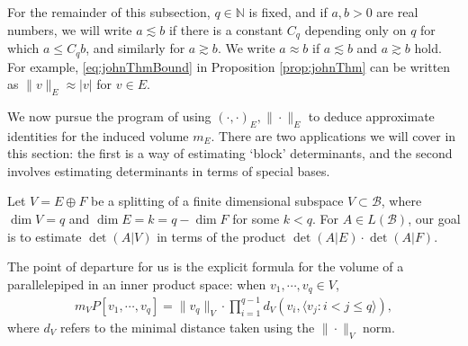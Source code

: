 \documentclass[11pt]{amsart}
\theoremstyle{theorem}
\theoremstyle{definition}
\numberwithin{equation}{section}
\newcommand{\N}{\mathbb{N}}
\newcommand{\Bc}{\mathcal{B}}
\begin{document}
 For the remainder of this subsection, $q \in \N$ is fixed, and if $a,b > 0$ are real numbers, we will write $a \lesssim b$ if there is a constant $C_q$ depending only on $q$ for which $a \leq C_q b$, and similarly for $a \gtrsim b$. We write $a \approx b$ if $a \lesssim b$ and $a \gtrsim b$ hold. For example, \eqref{eq:johnThmBound} in Proposition \ref{prop:johnThm} can be written as $ \|v\|_E \approx |v|$ for $v \in E$.

We now pursue the program of using $(\cdot, \cdot)_E, \| \cdot\|_E$ to deduce approximate identities for the induced volume $m_E$. There are two applications we will cover in this section: the first is a way of estimating `block' determinants, and the second involves estimating determinants in terms of special bases.

\smallskip
{}

Let $V = E \oplus F$ be a splitting of a finite dimensional subspace $V \subset \Bc$, where $\dim V = q$ and $\dim E = k = q - \dim F$ for some $k < q$. For $A \in L(\Bc)$, our goal is to estimate $\det(A | V)$ in terms of the product $\det(A | E) \cdot \det(A | F)$.

The point of departure for us is the explicit formula for the volume of a parallelepiped in an inner product space: when $v_1, \cdots, v_q \in V$,
\begin{align}\label{eq:massForm}
m_V P[v_1, \cdots, v_q] = \|v_q\|_V \cdot \prod_{i = 1}^{q - 1} d_V(v_i, \langle v_j : i < j \leq q \rangle),
\end{align}
where $d_V$ refers to the minimal distance taken using the $\|\cdot\|_V$ norm. 
\end{document}
